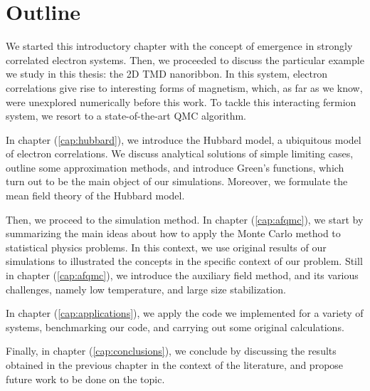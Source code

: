 \section{Outline}
\label{sec:int_outline}

We started this introductory chapter with the concept of emergence in strongly correlated electron systems.
Then, we proceeded to discuss the particular example we study in this thesis: the \acs{2D} \acs{TMD} nanoribbon.
In this system, electron correlations give rise to interesting forms of magnetism, which, as far as we know, were unexplored numerically before this work.
To tackle this interacting fermion system, we resort to a state-of-the-art \ac{QMC} algorithm.

In chapter (\ref{cap:hubbard}), we  introduce the Hubbard model, a ubiquitous model of electron correlations.
We discuss analytical solutions of simple limiting cases, outline some approximation methods, and introduce Green's functions, which turn out to be the main object of our simulations.
Moreover, we formulate the mean field theory of the Hubbard model.

Then, we proceed to the simulation method.
In chapter (\ref{cap:afqmc}), we start by summarizing the main ideas about how to apply the Monte Carlo method to statistical physics problems.
In this context, we use original results of our simulations to illustrated the concepts in the specific context of our problem.
Still in chapter (\ref{cap:afqmc}), we introduce the auxiliary field method, and its various challenges, namely low temperature, and large size stabilization.

In chapter (\ref{cap:applications}), we apply the code we implemented for a variety of systems, benchmarking our code, and carrying out some original calculations.

Finally, in chapter (\ref{cap:conclusions}), we conclude by discussing the results obtained in the previous chapter in the context of the literature, and propose future work to be done on the topic.